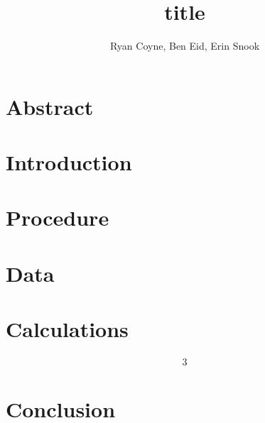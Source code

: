 \documentclass[12pt]{article}
\begin{document}
    \title{title}
    \author{Ryan Coyne, Ben Eid, Erin Snook}
    \maketitle

    \section{Abstract}
        
    \section{Introduction}

    \section{Procedure}

    \section{Data}

    \section{Calculations}
        \begin{alignat*}{3}
        \end{alignat*}
    \section{Conclusion}
        
\end{document}
